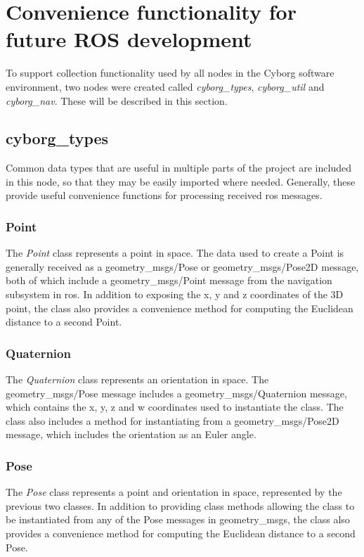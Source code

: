 \documentclass[\rootfolder/main.tex]{subfiles}
\begin{document}
\section{Convenience functionality for future ROS development}

To support collection functionality used by all nodes in the Cyborg software environment, two nodes were created called \emph{cyborg\_types}, \emph{cyborg\_util} and \emph{cyborg\_nav}.
These will be described in this section.

\subsection{cyborg\_types}

Common data types that are useful in multiple parts of the project are included in this node, so that they may be easily imported where needed.
Generally, these provide useful convenience functions for processing received \acrshort{ros} messages.

\subsubsection{Point}

The \emph{Point} class represents a point in space.
The data used to create a Point is generally received as a geometry\_msgs/Pose or geometry\_msgs/Pose2D message, both of which include a geometry\_msgs/Point message from the navigation subsystem in \acrshort{ros}.
In addition to exposing the x, y and z coordinates of the 3D point, the class also provides a convenience method for computing the Euclidean distance to a second Point.

\subsubsection{Quaternion}

The \emph{Quaternion} class represents an orientation in space.
The geometry\_msgs/Pose message includes a geometry\_msgs/Quaternion message, which contains the x, y, z and w coordinates used to instantiate the class.
The class also includes a method for instantiating from a geometry\_msgs/Pose2D message, which includes the orientation as an Euler angle.

\subsubsection{Pose}

The \emph{Pose} class represents a point and orientation in space, represented by the previous two classes.
In addition to providing class methods allowing the class to be instantiated from any of the Pose messages in geometry\_msgs, the class also provides a convenience method for computing the Euclidean distance to a second Pose.
\end{document}
